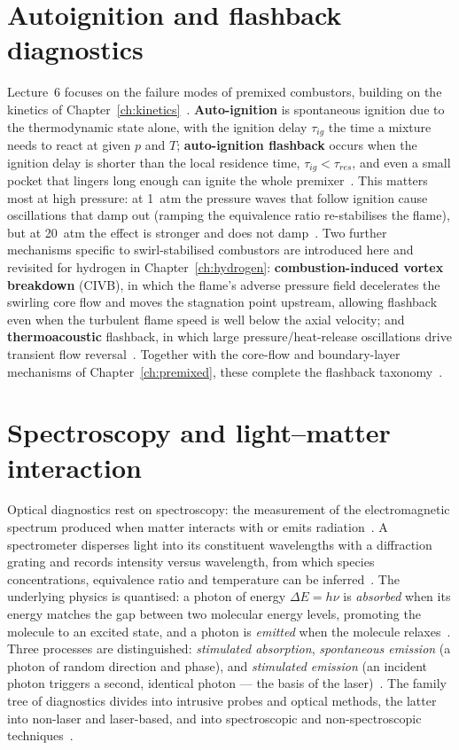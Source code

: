 \section{Autoignition and flashback diagnostics}

Lecture~6 focuses on the failure modes of premixed combustors, building on the kinetics of Chapter~\ref{ch:kinetics}~\cite{lecture6}. \textbf{Auto-ignition} is spontaneous ignition due to the thermodynamic state alone, with the ignition delay $\tau_{ig}$ the time a mixture needs to react at given $p$ and $T$; \textbf{auto-ignition flashback} occurs when the ignition delay is shorter than the local residence time, $\tau_{ig}<\tau_{res}$, and even a small pocket that lingers long enough can ignite the whole premixer~\cite{lecture6}. This matters most at high pressure: at \SI{1}{atm} the pressure waves that follow ignition cause oscillations that damp out (ramping the equivalence ratio re-stabilises the flame), but at \SI{20}{atm} the effect is stronger and does not damp~\cite{lecture6}. Two further mechanisms specific to swirl-stabilised combustors are introduced here and revisited for hydrogen in Chapter~\ref{ch:hydrogen}: \textbf{combustion-induced vortex breakdown} (CIVB), in which the flame's adverse pressure field decelerates the swirling core flow and moves the stagnation point upstream, allowing flashback even when the turbulent flame speed is well below the axial velocity; and \textbf{thermoacoustic} flashback, in which large pressure/heat-release oscillations drive transient flow reversal~\cite{lecture6}. Together with the core-flow and boundary-layer mechanisms of Chapter~\ref{ch:premixed}, these complete the flashback taxonomy~\cite{lecture5,lecture6}.

\section{Spectroscopy and light--matter interaction}

Optical diagnostics rest on spectroscopy: the measurement of the electromagnetic spectrum produced when matter interacts with or emits radiation~\cite{lecture6}. A spectrometer disperses light into its constituent wavelengths with a diffraction grating and records intensity versus wavelength, from which species concentrations, equivalence ratio and temperature can be inferred~\cite{lecture6}. The underlying physics is quantised: a photon of energy $\Delta E=h\nu$ is \emph{absorbed} when its energy matches the gap between two molecular energy levels, promoting the molecule to an excited state, and a photon is \emph{emitted} when the molecule relaxes~\cite{lecture6,lecture7}. Three processes are distinguished: \emph{stimulated absorption}, \emph{spontaneous emission} (a photon of random direction and phase), and \emph{stimulated emission} (an incident photon triggers a second, identical photon --- the basis of the laser)~\cite{lecture7}. The family tree of diagnostics divides into intrusive probes and optical methods, the latter into non-laser and laser-based, and into spectroscopic and non-spectroscopic techniques~\cite{lecture6}.

